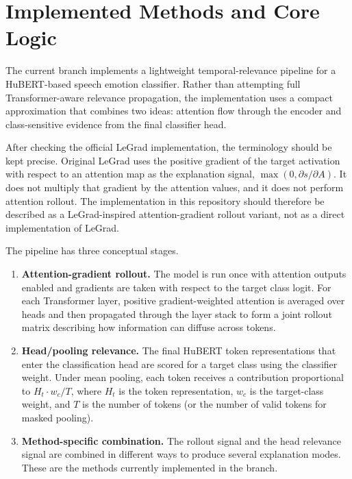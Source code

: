 \documentclass[11pt]{article}
\begin{document}
\section{Implemented Methods and Core Logic}

The current branch implements a lightweight temporal-relevance pipeline for a HuBERT-based speech emotion classifier. Rather than attempting full Transformer-aware relevance propagation, the implementation uses a compact approximation that combines two ideas: attention flow through the encoder and class-sensitive evidence from the final classifier head.

After checking the official LeGrad implementation, the terminology should be
kept precise. Original LeGrad uses the positive gradient of the target
activation with respect to an attention map as the explanation signal,
$\max(0, \partial s / \partial A)$. It does not multiply that gradient by the
attention values, and it does not perform attention rollout. The implementation
in this repository should therefore be described as a LeGrad-inspired
attention-gradient rollout variant, not as a direct implementation of LeGrad.

The pipeline has three conceptual stages.

\begin{enumerate}
  \item \textbf{Attention-gradient rollout.} The model is run once with
  attention outputs enabled and gradients are taken with respect to the target
  class logit. For each Transformer layer, positive gradient-weighted attention
  is averaged over heads and then propagated through the layer stack to form a
  joint rollout matrix describing how information can diffuse across tokens.

  \item \textbf{Head/pooling relevance.} The final HuBERT token representations that enter the classification head are scored for a target class using the classifier weight. Under mean pooling, each token receives a contribution proportional to $H_t \cdot w_c / T$, where $H_t$ is the token representation, $w_c$ is the target-class weight, and $T$ is the number of tokens (or the number of valid tokens for masked pooling).

  \item \textbf{Method-specific combination.} The rollout signal and the head relevance signal are combined in different ways to produce several explanation modes. These are the methods currently implemented in the branch.
\end{enumerate}
\end{document}
